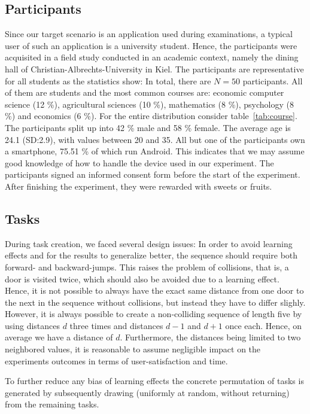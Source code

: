 \documentclass{sig-alternate-05-2015}
\begin{document}
\subsection{Participants}
Since our target scenario is an application used during examinations,
a typical user of such an application is a university student.
Hence, the participants were acquisited in a field study conducted in an academic context, namely the dining hall of Christian-Albrechts-University in Kiel.
The participants are representative for all students as the statistics show: In total, there are $N = 50$ participants.
All of them are students and the most common courses are: economic computer science (12 \%), agricultural sciences (10 \%), mathematics (8 \%), psychology (8 \%) and economics (6 \%).
For the entire distribution consider table~\ref{tab:course}.
The participants split up into 42 \% male and 58 \% female. The average age is 24.1 (SD:\@2.9),
with values between 20 and 35. 
All but one of the participants own a
smartphone, 75.51 \% of which run Android. This indicates that we may assume good knowledge
of how to handle the device used in our experiment.
The participants signed an informed consent form before the start of the experiment. After
finishing the experiment, they were rewarded with sweets or fruits.

\subsection{Tasks}
\label{sec:task}
During task creation, we faced several design issues: In order to avoid learning effects and for the results to generalize better, 
the sequence should require both forward- and backward-jumps. This raises the problem of collisions, that is, a door is visited twice, which
should also be avoided due to a learning effect. Hence, it is not possible to always have the exact same distance from one door to the
next in the sequence without collisions, but instead they have to differ slighly. However, it is always possible to create a non-colliding sequence of
length five by using distances $d$ three times and distances $d - 1$ and $d + 1$ once each. Hence, on average we have a distance of $d$. 
Furthermore, the distances being limited to two neighbored values, it is reasonable to assume negligible
impact on the experiments outcomes in terms of user-satisfaction and time.

To further reduce any bias of learning effects
the concrete permutation of tasks is generated by subsequently drawing
(uniformly at random, without returning) from the remaining tasks.
\end{document}
